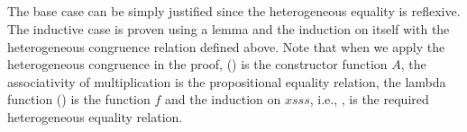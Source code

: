\documentclass{l4proj}
\begin{document}
\begin{code}
%
\>[2]\AgdaSpace{}%
\AgdaSpace{}%
\AgdaSpace{}%
\AgdaSymbol{(}\AgdaSpace{}%
\AgdaSymbol{)}\AgdaSpace{}%
\<%
\\
\>[2][@{}l@{\AgdaIndent{0}}]%
\>[4]\AgdaSpace{}%
\AgdaSpace{}%
\AgdaOperator{\AgdaFunction{++}}\AgdaSpace{}%
\AgdaSpace{}%
\AgdaSymbol{(}\AgdaSpace{}%
\AgdaSymbol{)}\<%
\\
%
\>[2]\AgdaSpace{}%
\AgdaSpace{}%
\AgdaSymbol{(}\AgdaSpace{}%
\AgdaSymbol{)}\AgdaSpace{}%
\AgdaSymbol{(}\AgdaSpace{}%
\AgdaSpace{}%
\AgdaSpace{}%
\AgdaSymbol{)}\AgdaSpace{}%
\AgdaSpace{}%
\AgdaSpace{}%
\AgdaSpace{}%
\AgdaSpace{}%
\AgdaSpace{}%
\AgdaOperator{\AgdaFunction{++}}\AgdaSpace{}%
\AgdaSymbol{)}\AgdaSpace{}%
\AgdaSymbol{(}\AgdaSpace{}%
\AgdaSymbol{)}\AgdaSpace{}%
\<%
\\
\>[2][@{}l@{\AgdaIndent{0}}]%
\>[4]\AgdaSpace{}%
\AgdaSpace{}%
\AgdaOperator{\AgdaFunction{++}}\AgdaSpace{}%
\AgdaSpace{}%
\AgdaSymbol{(}\AgdaSpace{}%
\AgdaSpace{}%
\AgdaSymbol{)}\<%
\\
%
\>[2]\<%
\end{code}
The base case can be simply justified since the heterogeneous equality is reflexive. The inductive case is proven using a lemma  and the induction on itself with the heterogeneous congruence relation defined above. Note that when we apply the heterogeneous congruence in the proof, (\AgdaSpace{}) is the constructor function $A$, the associativity of multiplication  is the propositional equality relation, the lambda function (\AgdaSpace{}\AgdaSpace{}\AgdaSpace{}\AgdaSpace{}\AgdaSpace{}\AgdaOperator{\AgdaFunction{++}}\AgdaSpace{}) is the function $f$ and the induction on $xsss$, i.e., \AgdaSpace{}, is the required heterogeneous equality relation.
\end{document}

